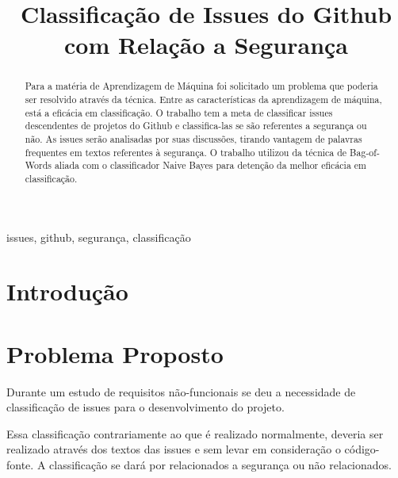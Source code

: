 \documentclass[conference]{IEEEtran}
\begin{document}
\title{Classificação de Issues do Github com Relação a Segurança}

\author{
    \and
}

\maketitle

\begin{abstract}
    Para a matéria de Aprendizagem de Máquina foi solicitado um problema que poderia ser resolvido através da técnica. Entre as características da aprendizagem de máquina, está a eficácia em classificação. O trabalho tem a meta de classificar issues descendentes de projetos do Github e classifica-las se são referentes a segurança ou não. As issues serão analisadas por suas discussões, tirando vantagem de palavras frequentes em textos referentes à segurança. O trabalho utilizou da técnica de Bag-of-Words aliada com o classificador Naive Bayes para detenção da melhor eficácia em classificação.
\end{abstract}

\begin{IEEEkeywords}
    issues, github, segurança, classificação
\end{IEEEkeywords}

\section{Introdução}


\section{Problema Proposto}

Durante um estudo de requisitos não-funcionais se deu a necessidade de classificação de issues para o desenvolvimento do projeto.

Essa classificação contrariamente ao que é realizado normalmente, deveria ser realizado através dos textos das issues e sem levar em consideração o código-fonte. A classificação se dará por relacionados a segurança ou não relacionados.
\end{document}
